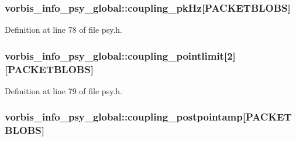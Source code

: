 \subsubsection[{\texorpdfstring{coupling\+\_\+pk\+Hz}{coupling_pkHz}}]{ vorbis\+\_\+info\+\_\+psy\+\_\+global\+::coupling\+\_\+pk\+Hz\mbox{[}{\bf P\+A\+C\+K\+E\+T\+B\+L\+O\+BS}\mbox{]}}\hypertarget{structvorbis__info__psy__global_a46c3c0ac9f76869103f947718087458b}{}\label{structvorbis__info__psy__global_a46c3c0ac9f76869103f947718087458b}


Definition at line 78 of file psy.\+h.

\subsubsection[{\texorpdfstring{coupling\+\_\+pointlimit}{coupling_pointlimit}}]{ vorbis\+\_\+info\+\_\+psy\+\_\+global\+::coupling\+\_\+pointlimit\mbox{[}2\mbox{]}\mbox{[}{\bf P\+A\+C\+K\+E\+T\+B\+L\+O\+BS}\mbox{]}}\hypertarget{structvorbis__info__psy__global_a1f9a75e3bd47d5f025d89cd17c3100f2}{}\label{structvorbis__info__psy__global_a1f9a75e3bd47d5f025d89cd17c3100f2}


Definition at line 79 of file psy.\+h.

\subsubsection[{\texorpdfstring{coupling\+\_\+postpointamp}{coupling_postpointamp}}]{ vorbis\+\_\+info\+\_\+psy\+\_\+global\+::coupling\+\_\+postpointamp\mbox{[}{\bf P\+A\+C\+K\+E\+T\+B\+L\+O\+BS}\mbox{]}}\hypertarget{structvorbis__info__psy__global_a308dce72e7dc0a4ad1f33fc760f454f0}{}\label{structvorbis__info__psy__global_a308dce72e7dc0a4ad1f33fc760f454f0}



